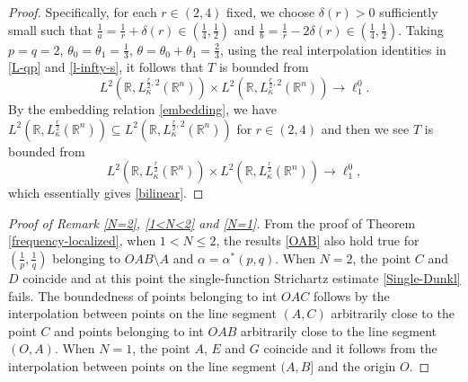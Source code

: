 \documentclass[a4paper,11pt, reqno]{amsart}
\numberwithin{equation}{section}
\theoremstyle{plain}
\theoremstyle{definition}
\theoremstyle{remark}
\begin{document}
\begin{proof}
Specifically, for each $r\in (2,4)$ fixed, we choose $\delta(r)>0$ sufficiently small such that $\frac{1}{a}=\frac{1}{r}+\delta(r)\in\left(\frac{1}{4},\frac{1}{2}\right)$ and $\frac{1}{b}=\frac{1}{r}-2\delta(r)\in\left(\frac{1}{4},\frac{1}{2}\right)$. 
Taking $p=q=2$, $\theta_0=\theta_1=\frac{1}{3}$, $\theta=\theta_0+\theta_1=\frac{2}{3}$, using the real interpolation identities in \eqref{L-qp} and \eqref{l-infty-s}, it follows that $T$ is bounded from
\begin{equation*}
    L^2(\mathbb{R},L^{\frac{r}{2},2}_\kappa(\mathbb{R}^n))\times L^2(\mathbb{R},L^{\frac{r}{2},2}_\kappa(\mathbb{R}^n))\rightarrow \ell^0_1.
\end{equation*}
By the embedding relation \eqref{embedding}, we have $L^2(\mathbb{R},L^{\frac{r}{2}}_\kappa(\mathbb{R}^n))\subseteq L^2(\mathbb{R},L^{\frac{r}{2},2}_\kappa(\mathbb{R}^n))$ for $r\in (2,4)$ and then we see $T$ is bounded from
\begin{equation*}
    L^2(\mathbb{R},L^{\frac{r}{2}}_\kappa(\mathbb{R}^n))\times L^2(\mathbb{R},L^{\frac{r}{2}}_\kappa(\mathbb{R}^n))\rightarrow \ell^0_1,
\end{equation*}
which essentially gives  \eqref{bilinear}.
\end{proof}
 
      

 

\begin{proof}[Proof of Remark \ref{N=2}, \ref{1<N<2} and \ref{N=1}]
From the proof of Theorem \ref{frequency-localized}, when $1<N\leq2$, the results \eqref{OAB} also hold true for $(\frac{1}{p},\frac{1}{q})$ belonging to $OAB\setminus A$ and $\alpha=\alpha^*(p,q)$. When $N=2$, the point $C$ and $D$ coincide and at this point the single-function Strichartz estimate \eqref{Single-Dunkl} fails. The boundedness of points belonging to int $OAC$ follows by the interpolation between points on the line segment $(A,C)$ arbitrarily close to the point $C$ and points belonging to int $OAB$ arbitrarily close to the line segment $(O,A)$. When $N=1$, the point $A$, $E$ and $G$ coincide and it follows from the interpolation between points on the line segment $(A,B]$ and the origin $O$.
\end{proof}
\end{document}
